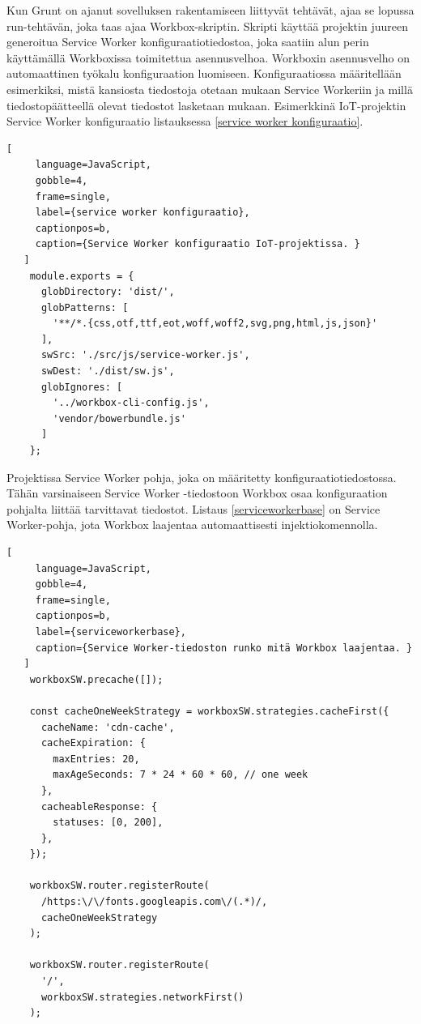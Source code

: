 \documentclass{tktltiki}
\begin{document}
Kun Grunt on ajanut sovelluksen rakentamiseen liittyvät tehtävät, ajaa se lopussa run-tehtävän, joka taas ajaa Workbox-skriptin. Skripti käyttää projektin juureen generoitua Service Worker konfiguraatiotiedostoa, joka saatiin alun perin käyttämällä Workboxissa toimitettua asennusvelhoa. Workboxin asennusvelho on automaattinen työkalu konfiguraation luomiseen. Konfiguraatiossa määritellään esimerkiksi, mistä kansiosta tiedostoja otetaan mukaan Service Workeriin ja millä tiedostopäätteellä olevat tiedostot lasketaan mukaan. Esimerkkinä IoT-projektin Service Worker konfiguraatio listauksessa \ref{service worker konfiguraatio}.

\begin{lstlisting}[
     language=JavaScript,
     gobble=4,
     frame=single,
     label={service worker konfiguraatio},
     captionpos=b,
     caption={Service Worker konfiguraatio IoT-projektissa. }
   ]
    module.exports = {
      globDirectory: 'dist/',
      globPatterns: [
        '**/*.{css,otf,ttf,eot,woff,woff2,svg,png,html,js,json}'
      ],
      swSrc: './src/js/service-worker.js',
      swDest: './dist/sw.js',
      globIgnores: [
        '../workbox-cli-config.js',
        'vendor/bowerbundle.js'
      ]
    };
\end{lstlisting}

Projektissa Service Worker pohja, joka on määritetty konfiguraatiotiedostossa. Tähän varsinaiseen Service Worker -tiedostoon Workbox osaa konfiguraation pohjalta liittää tarvittavat tiedostot. Listaus \ref{serviceworkerbase} on Service Worker-pohja, jota Workbox laajentaa automaattisesti injektiokomennolla.

\begin{lstlisting}[
     language=JavaScript,
     gobble=4,
     frame=single,
     captionpos=b,
     label={serviceworkerbase},
     caption={Service Worker-tiedoston runko mitä Workbox laajentaa. }
   ]
    workboxSW.precache([]);
    
    const cacheOneWeekStrategy = workboxSW.strategies.cacheFirst({
      cacheName: 'cdn-cache',
      cacheExpiration: {
        maxEntries: 20,
        maxAgeSeconds: 7 * 24 * 60 * 60, // one week
      },
      cacheableResponse: {
        statuses: [0, 200],
      },
    });
    
    workboxSW.router.registerRoute(
      /https:\/\/fonts.googleapis.com\/(.*)/,
      cacheOneWeekStrategy
    );
    
    workboxSW.router.registerRoute(
      '/',
      workboxSW.strategies.networkFirst()
    );
\end{lstlisting}
\end{document}
